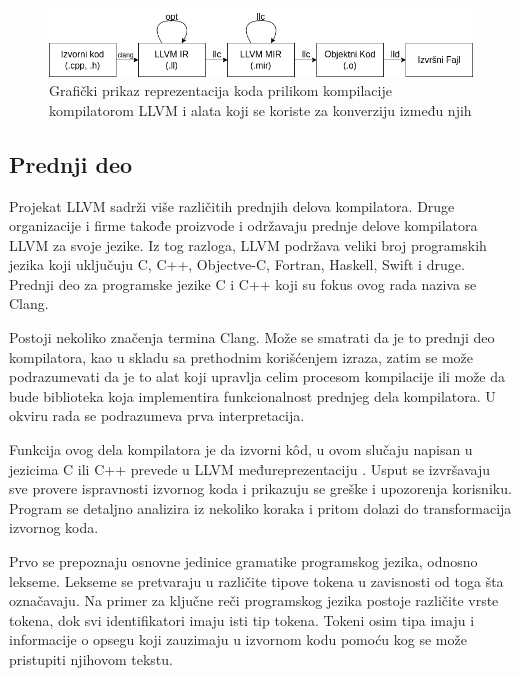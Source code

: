 \documentclass[12pt,oneside]{memoir}
\begin{document}
\begin{figure}[!ht]
  \centering
  \includegraphics[width=\textwidth]{assets/llvm_compile_tools.png}
  \caption{Grafički prikaz reprezentacija koda prilikom kompilacije kompilatorom LLVM i alata koji se koriste za konverziju između njih}
  \label{fig:llvm_compile_tools}
\end{figure}


\subsection{Prednji deo}

Projekat LLVM sadrži više različitih prednjih delova kompilatora.
Druge organizacije i firme takođe proizvode i održavaju prednje delove kompilatora LLVM za svoje jezike.
Iz tog razloga, LLVM podržava veliki broj programskih jezika koji uključuju C, C++, Objectve-C, Fortran, Haskell, Swift i druge.
Prednji deo za programske jezike C i C++ koji su fokus ovog rada naziva se Clang.

Postoji nekoliko značenja termina Clang.
Može se smatrati da je to prednji deo kompilatora, kao u skladu sa prethodnim korišćenjem izraza, zatim se može podrazumevati da je to alat koji upravlja celim procesom kompilacije ili može da bude biblioteka koja implementira funkcionalnost prednjeg dela kompilatora.
U okviru rada se podrazumeva prva interpretacija.

Funkcija ovog dela kompilatora je da izvorni k\^od, u ovom slučaju napisan u jezicima C ili C++ prevede u LLVM međureprezentaciju \cite{lopes2014llvmcorelibs}.
Usput se izvršavaju sve provere ispravnosti izvornog koda i prikazuju se greške i upozorenja korisniku.
Program se detaljno analizira iz nekoliko koraka i pritom dolazi do transformacija izvornog koda.

Prvo se prepoznaju osnovne jedinice gramatike programskog jezika, odnosno lekseme.
Lekseme se pretvaraju u različite tipove tokena u zavisnosti od toga šta označavaju.
Na primer za ključne reči programskog jezika postoje različite vrste tokena, dok svi identifikatori imaju isti tip tokena.
Tokeni osim tipa imaju i informacije o opsegu koji zauzimaju u izvornom kodu pomoću kog se može pristupiti njihovom tekstu.
\end{document}
